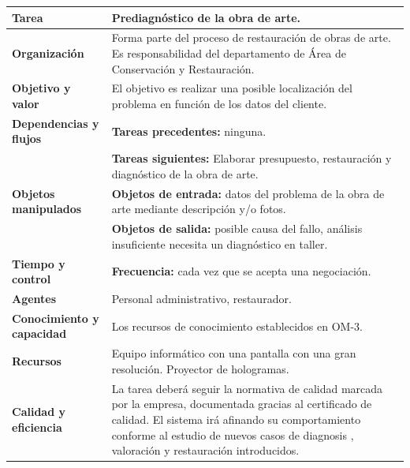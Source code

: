 \documentclass[a4paper,11pt]{article}
\begin{document}
			\newpage
			\begin{center}
				\begin{tabular}{| l | p{6.5cm} |}
					\hline
					\cellcolor[RGB]{224,233,250}\textbf{Tarea} & Prediagnóstico de la obra de
					arte.\\
					\hline
					\cellcolor[RGB]{224,233,250}\textbf{Organización} & Forma parte del proceso
					de restauración de obras de arte. Es responsabilidad del departamento de Área de Conservación y
					Restauración.\\
					\hline
					\cellcolor[RGB]{224,233,250}\textbf{Objetivo y valor} & El objetivo es
					realizar una posible localización del problema en función de los datos del cliente.\\
					\hline
					\cellcolor[RGB]{224,233,250}\textbf{Dependencias y flujos} & \textbf{Tareas
					precedentes:} ninguna.\\
					\cellcolor[RGB]{224,233,250}& \textbf{Tareas siguientes:} Elaborar
					presupuesto, restauración y diagnóstico de la obra de arte.\\
					\hline
					\cellcolor[RGB]{224,233,250}\textbf{Objetos manipulados} & \textbf{Objetos
					de entrada:} datos del problema de la obra de arte mediante descripción y/o fotos.\\
					\cellcolor[RGB]{224,233,250}& \textbf{Objetos de salida:} posible causa del
					fallo, análisis insuficiente necesita un diagnóstico en taller.\\
					\hline
					\cellcolor[RGB]{224,233,250}\textbf{Tiempo y control} &
					\textbf{Frecuencia:} cada vez que se acepta una negociación.\\
					\hline
					\cellcolor[RGB]{224,233,250}\textbf{Agentes} & Personal administrativo,
					restaurador.\\
					\hline
					\cellcolor[RGB]{224,233,250}\textbf{Conocimiento y capacidad} & Los
					recursos de conocimiento establecidos en OM-3.\\
					\hline
					\cellcolor[RGB]{224,233,250}\textbf{Recursos} & Equipo informático con una
					pantalla con una gran resolución. Proyector de hologramas.\\
					\hline
					\cellcolor[RGB]{224,233,250}\textbf{Calidad y eficiencia} & La tarea deberá
					seguir la normativa de calidad marcada por la empresa, documentada gracias al certificado de calidad. El sistema irá afinando su comportamiento conforme al estudio de nuevos casos de diagnosis , valoración y restauración introducidos.\\
					\hline
				\end{tabular}
			\end{center}
\end{document}
